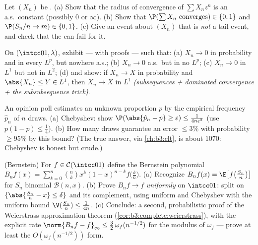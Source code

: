 \begin{exercise}[$\star\star$]\label{exo:b3:probability:5}
Let $(X_n)$ be .
(a) Show that the radius of convergence of $\sum X_n z^n$ is
an a.s.\ constant (possibly $0$ or $\infty$).
(b) Show that $\P(\sum X_n \text{ converges}) \in \{0, 1\}$
and $\P(S_n/n \to m) \in \{0,1\}$.
(c) Give an event about $(X_n)$ that is \emph{not} a tail
event, and check that the  can fail for it.
\end{exercise}

\begin{exercise}[$\star\star$]\label{exo:b3:probability:6}
On $(\intcc01, \lambda)$, exhibit --- with proofs ---  such that:
(a) $X_n \to 0$ in probability and in every $L^p$, but
nowhere a.s.;
(b) $X_n \to 0$ a.s.\ but in no $L^p$;
(c) $X_n \to 0$ in $L^1$ but not in $L^2$;
(d) and show: if $X_n \to X$ in probability and $\abs{X_n}
\leq Y \in L^1$, then $X_n \to X$ in $L^1$
\emph{(subsequences + dominated convergence +
the subsubsequence trick)}.
\end{exercise}

\begin{exercise}[$\star\star$]\label{exo:b3:probability:7}
An opinion poll estimates an unknown proportion $p$ by the
empirical frequency $\hat p_n$ of $n$  draws.
(a) Chebyshev: show $\P(\abs{\hat p_n - p} \geq \varepsilon)
\leq \frac1{4n\varepsilon^2}$ (use $p(1-p) \leq \frac14$).
(b) How many draws guarantee an error $\leq 3\%$ with
probability $\geq 95\%$ by this bound? (The true answer,
via \cref{ch:b3:clt}, is about $1070$: Chebyshev is honest
but crude.)
\end{exercise}

\begin{exercise}[$\star\star\star$]\label{exo:b3:probability:8}
(Bernstein) For $f \in \mathcal C(\intcc01)$ define the
Bernstein polynomial $B_nf(x) =
\sum_{k=0}^n\binom nkx^k(1-x)^{n-k}f\bigl(\frac kn\bigr)$.
(a) Recognize $B_nf(x) = \E\bigl[f\bigl(\frac
{S_n}n\bigr)\bigr]$ for $S_n$ binomial $\mathcal B(n, x)$.
(b) Prove $B_nf \to f$ \emph{uniformly} on $\intcc01$: split
on $\{\abs{\frac{S_n}n - x} \leq \delta\}$ and its
complement, using uniform  and Chebyshev with the
uniform bound $\V(\frac{S_n}n) \leq \frac1{4n}$.
(c) Conclude: a second, probabilistic proof of the
Weierstrass approximation theorem
(\cref{cor:b3:complete:weierstrass}), with the explicit rate
$\norm{B_nf - f}_\infty \leq \frac32\,\omega_f(n^{-1/2})$
for the modulus of  $\omega_f$ --- prove at least
the $O(\omega_f(n^{-1/2}))$ form.
\end{exercise}

